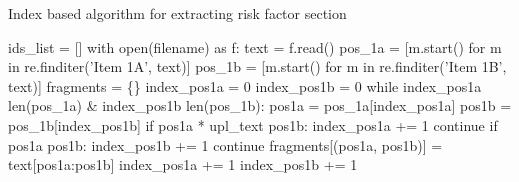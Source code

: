 \documentclass[12pt,MSc,a4paper,oneside]{muthesis}
\begin{document}
\begin{algorithm}
\caption{Index based algorithm for extracting risk factor section}
\label{appendix:2}
\begin{algorithmic}
ids\_list = [] \newline
with open(filename) as f: \newline
     text = f.read() \newline
  pos\_1a = [m.start() for m in re.finditer('Item 1A', text)] \newline
  pos\_1b = [m.start() for m in re.finditer('Item 1B', text)] \newline
  fragments = \{\} \newline
  index\_pos1a = 0 \newline
  index\_pos1b = 0 \newline
while index\_pos1a \leq len(pos\_1a)   \&   index\_pos1b \leq len(pos\_1b): \newline
     pos1a = pos\_1a[index\_pos1a] \newline
     pos1b = pos\_1b[index\_pos1b] \newline
       if pos1a * upl\_text \leq pos1b: \newline
           index\_pos1a += 1 \newline
           continue \newline
       if pos1a \geq pos1b: \newline
           index\_pos1b += 1 \newline
           continue \newline
       fragments[(pos1a, pos1b)] = text[pos1a:pos1b] \newline
       index\_pos1a += 1 \newline
       index\_pos1b += 1 \newline
\end{algorithmic}
\end{algorithm}
\end{document}
